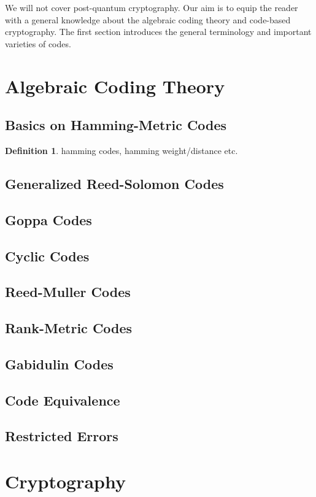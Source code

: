 \documentclass[a4paper,11pt]{article}
\theoremstyle{definition}
\newtheorem{definition}{Definition}
\begin{document}
We will not cover post-quantum cryptography. Our aim is to equip the reader with a general knowledge about the algebraic coding theory and code-based cryptography. The first section introduces the general terminology and important varieties of codes.

\section{Algebraic Coding Theory}

\subsection{Basics on Hamming-Metric Codes}

\begin{definition}
hamming codes, hamming weight/distance etc.    
\end{definition}

\subsection{Generalized Reed-Solomon Codes}
\subsection{Goppa Codes}
\subsection{Cyclic Codes}
\subsection{Reed-Muller Codes}
\subsection{Rank-Metric Codes}
\subsection{Gabidulin Codes}
\subsection{Code Equivalence}
\subsection{Restricted Errors}

\section{Cryptography}
\end{document}
